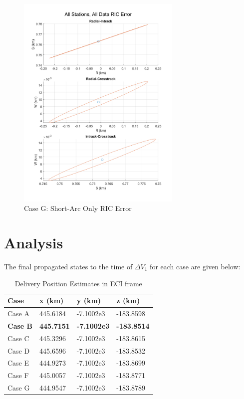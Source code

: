 \documentclass[conf]{new-aiaa}
\begin{document}
\begin{figure}[H]
	\centering
	\includegraphics[width=0.7\textwidth]{caseG_RICerr.png}
	\caption{Case G: Short-Arc Only RIC Error}
\end{figure}


\section*{Analysis}

The final propagated states to the time of $\Delta V_1$ for each case are given below: 

\begin{table}[H]
	\centering
	\begin{tabular}{@{}llll@{}}
		\toprule
		Case & x (km)   & y (km)    & z (km)    \\ \midrule
		Case A & 445.6184 & -7.1002e3 & -183.8598 \\
		\textbf{Case B} & \textbf{445.7151} & \textbf{-7.1002e3} & \textbf{-183.8514} \\
		Case C & 445.3296 & -7.1002e3 & -183.8615 \\
		Case D & 445.6596 & -7.1002e3 & -183.8532 \\
		Case E & 444.9273 & -7.1002e3 & -183.8699 \\
		Case F & 445.0057 & -7.1002e3 & -183.8771 \\
		Case G & 444.9547 & -7.1002e3 & -183.8789 \\ \bottomrule
	\end{tabular}
\caption{Delivery Position Estimates in ECI frame}
\end{table}
\end{document}
